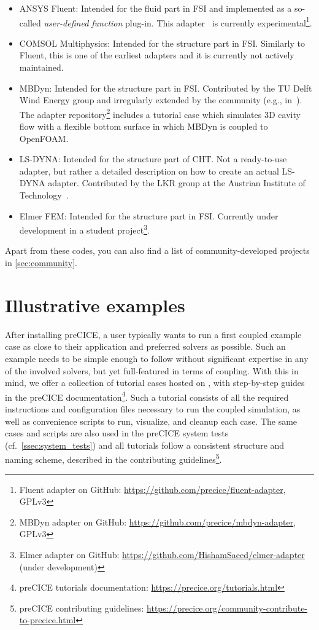 \begin{itemize}
  \item ANSYS Fluent: Intended for the fluid part in FSI
  and implemented as a so-called \textit{user-defined function} plug-in.
  This adapter~\cite{Gatzhammer2015,Hertrich2019} is currently experimental\footnote{Fluent adapter on GitHub: \url{https://github.com/precice/fluent-adapter}, GPLv3}.
  \item COMSOL Multiphysics: Intended for the structure part in FSI. Similarly to Fluent,
  this is one of the earliest adapters and it is currently not actively maintained.
  \item MBDyn: Intended for the structure part in FSI. Contributed by the TU Delft Wind Energy group and irregularly extended by the community (e.g., in~\cite{Cocco2020}).
  The adapter repository\footnote{MBDyn adapter on GitHub: \url{https://github.com/precice/mbdyn-adapter}, GPLv3} includes a tutorial case which simulates 3D cavity flow with a flexible bottom surface in which MBDyn is coupled to OpenFOAM.
  \item LS-DYNA: Intended for the structure part of CHT. Not a ready-to-use adapter, but rather a detailed description on how to create an actual LS-DYNA adapter. Contributed by the LKR group at the Austrian Institute of Technology~\cite{scheiblhofer2019coupling}.
  \item Elmer FEM: Intended for the structure part in FSI. Currently under development in a student project\footnote{Elmer adapter on GitHub: \url{https://github.com/HishamSaeed/elmer-adapter} (under development)}.
\end{itemize}

Apart from these codes, you can also find a list of community-developed projects in \autoref{sec:community}.

 \section{Illustrative examples}\label{sec:tutorials}

After installing preCICE, a user typically wants to run a first coupled example case as close to their application and preferred solvers as possible. Such an example needs to be simple enough to follow without significant expertise in any of the involved solvers, but yet full-featured in terms of coupling. With this in mind, we offer a collection of tutorial cases hosted on , with step-by-step guides in the preCICE documentation\footnote{preCICE tutorials documentation: \url{https://precice.org/tutorials.html}}. Such a tutorial consists of all the required instructions and configuration files necessary to run the coupled simulation, as well as convenience scripts to run, visualize, and cleanup each case. The same cases and scripts are also used in the preCICE system tests (cf.~\autoref{ssec:system_tests}) and all tutorials follow a consistent structure and naming scheme, described in the contributing guidelines\footnote{preCICE contributing guidelines: \url{https://precice.org/community-contribute-to-precice.html}}.


